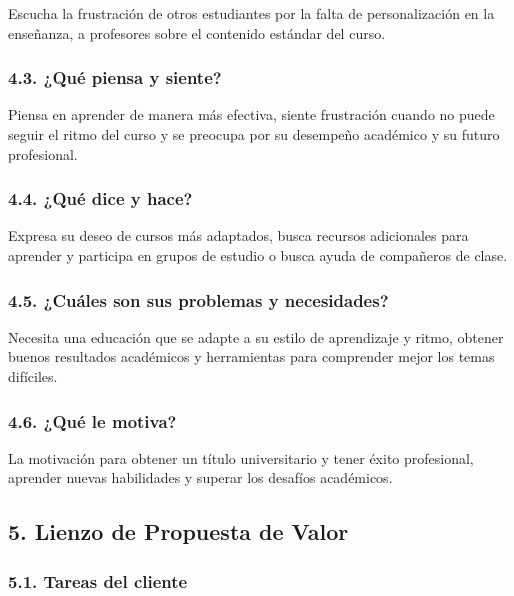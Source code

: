 \documentclass[
]{article}
\begin{document}
Escucha la frustración de otros estudiantes por la falta de
personalización en la enseñanza, a profesores sobre el contenido
estándar del curso.

\subsubsection{4.3. ¿Qué piensa y siente?}\label{quuxe9-piensa-y-siente}

Piensa en aprender de manera más efectiva, siente frustración cuando no
puede seguir el ritmo del curso y se preocupa por su desempeño académico
y su futuro profesional.

\subsubsection{4.4. ¿Qué dice y hace?}\label{quuxe9-dice-y-hace}

Expresa su deseo de cursos más adaptados, busca recursos adicionales
para aprender y participa en grupos de estudio o busca ayuda de
compañeros de clase.

\subsubsection{4.5. ¿Cuáles son sus problemas y
necesidades?}\label{cuuxe1les-son-sus-problemas-y-necesidades}

Necesita una educación que se adapte a su estilo de aprendizaje y ritmo,
obtener buenos resultados académicos y herramientas para comprender
mejor los temas difíciles.

\subsubsection{4.6. ¿Qué le motiva?}\label{quuxe9-le-motiva}

La motivación para obtener un título universitario y tener éxito
profesional, aprender nuevas habilidades y superar los desafíos
académicos.

\newpage

\subsection{5. Lienzo de Propuesta de
Valor}\label{lienzo-de-propuesta-de-valor}

\subsubsection{5.1. Tareas del cliente}\label{tareas-del-cliente}
\end{document}
